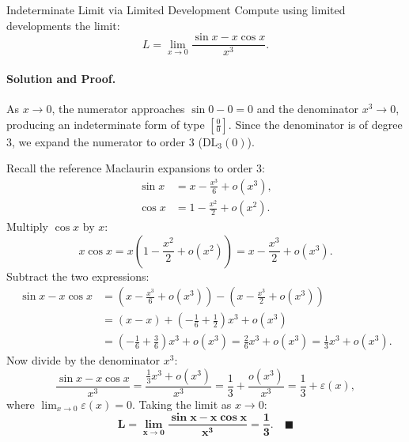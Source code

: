 \begin{workedexample}{Indeterminate Limit via Limited Development}
Compute using limited developments the limit:
\[
L = \lim_{x \to 0} \frac{\sin x - x \cos x}{x^3}.
\]

\paragraph{Solution and Proof.}
As $x \to 0$, the numerator approaches $\sin 0 - 0 = 0$ and the denominator $x^3 \to 0$, producing an indeterminate form of type $\left[ \frac{0}{0} \right]$.
Since the denominator is of degree $3$, we expand the numerator to order $3$ ($\mathrm{DL}_3(0)$).

Recall the reference Maclaurin expansions to order $3$:
\begin{align*}
\sin x &= x - \frac{x^3}{6} + o(x^3), \\
\cos x &= 1 - \frac{x^2}{2} + o(x^2).
\end{align*}
Multiply $\cos x$ by $x$:
\[
x \cos x = x \left( 1 - \frac{x^2}{2} + o(x^2) \right) = x - \frac{x^3}{2} + o(x^3).
\]
Subtract the two expressions:
\begin{align*}
\sin x - x \cos x &= \left( x - \frac{x^3}{6} + o(x^3) \right) - \left( x - \frac{x^3}{2} + o(x^3) \right) \\
                  &= (x - x) + \left( -\frac{1}{6} + \frac{1}{2} \right) x^3 + o(x^3) \\
                  &= \left( -\frac{1}{6} + \frac{3}{6} \right) x^3 + o(x^3) = \frac{2}{6} x^3 + o(x^3) = \frac{1}{3} x^3 + o(x^3).
\end{align*}
Now divide by the denominator $x^3$:
\[
\frac{\sin x - x \cos x}{x^3} = \frac{\frac{1}{3} x^3 + o(x^3)}{x^3} = \frac{1}{3} + \frac{o(x^3)}{x^3} = \frac{1}{3} + \varepsilon(x),
\]
where $\lim_{x \to 0} \varepsilon(x) = 0$.
Taking the limit as $x \to 0$:
\[
\mathbf{L = \lim_{x \to 0} \frac{\sin x - x \cos x}{x^3} = \frac{1}{3}}. \quad \blacksquare
\]
\end{workedexample}

